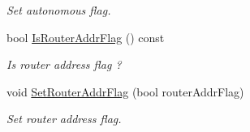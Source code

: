 \begin{DoxyCompactItemize}
\begin{DoxyCompactList}\small\item\em Set autonomous flag. \end{DoxyCompactList}\item 
bool \hyperlink{classns3_1_1RadvdPrefix_a8a7633ba97d224f50cb159dd635a7218}{Is\+Router\+Addr\+Flag} () const 
\begin{DoxyCompactList}\small\item\em Is router address flag ? \end{DoxyCompactList}\item 
void \hyperlink{classns3_1_1RadvdPrefix_a71e548e78f32b97a0b3c504fad98a87c}{Set\+Router\+Addr\+Flag} (bool router\+Addr\+Flag)
\begin{DoxyCompactList}\small\item\em Set router address flag. \end{DoxyCompactList}\end{DoxyCompactItemize}
